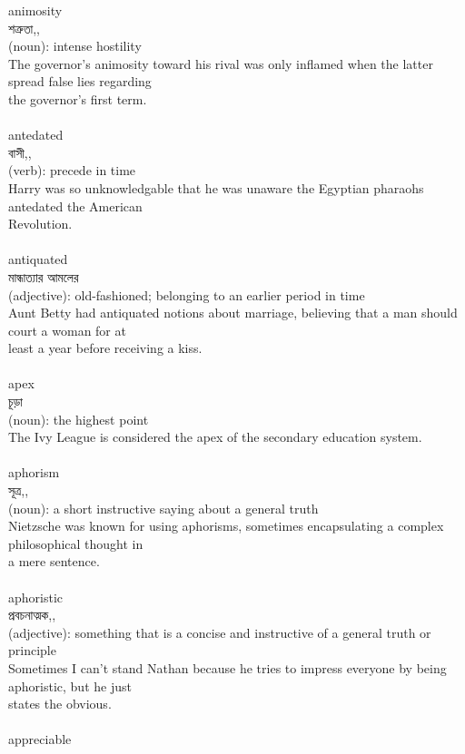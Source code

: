 \documentclass{article}
\begin{document}
{animosity}\\
{শত্রুতা,,}\\
{(noun): intense hostility\\The governor's animosity toward his rival was only inflamed when the latter spread false lies regarding\\the governor's first term.\\}\\
{antedated}\\
{বাসী,,}\\
{(verb): precede in time\\Harry was so unknowledgable that he was unaware the Egyptian pharaohs antedated the American\\Revolution.\\}\\
{antiquated}\\
{মান্ধাত্যার আমলের}\\
{(adjective): old-fashioned; belonging to an earlier period in time\\Aunt Betty had antiquated notions about marriage, believing that a man should court a woman for at\\least a year before receiving a kiss.\\}\\
{apex}\\
{চূড়া}\\
{(noun): the highest point\\The Ivy League is considered the apex of the secondary education system.\\}\\
{aphorism}\\
{সূত্র,,}\\
{(noun): a short instructive saying about a general truth\\Nietzsche was known for using aphorisms, sometimes encapsulating a complex philosophical thought in\\a mere sentence.\\}\\
{aphoristic}\\
{প্রবচনাত্মক,,}\\
{(adjective): something that is a concise and instructive of a general truth or principle\\Sometimes I can't stand Nathan because he tries to impress everyone by being aphoristic, but he just\\states the obvious.\\}\\
{appreciable}\\
\end{document}
